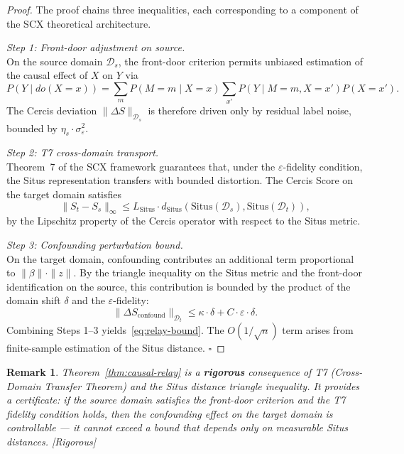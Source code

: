 \documentclass[12pt,a4paper]{article}
\newtheorem{remark}[theorem]{Remark}
\newcommand{\rigorous}{\textcolor{green!50!black}{\small\textsf{[Rigorous]}}}
\newcommand{\cD}{\mathcal{D}}
\newcommand{\Situs}{\mathrm{Situs}}
\begin{document}
\begin{proof}
The proof chains three inequalities, each corresponding to a component of the
SCX theoretical architecture.

\textit{Step 1: Front-door adjustment on source.}\\
On the source domain $\cD_s$, the front-door criterion permits unbiased
estimation of the causal effect of $X$ on $Y$ via
\begin{equation}\label{eq:front-door}
    P(Y \mid do(X=x)) = \sum_m P(M=m \mid X=x)
    \sum_{x'} P(Y \mid M=m, X=x') P(X=x').
\end{equation}
The Cercis deviation $\|\Delta S\|_{\cD_s}$ is therefore driven only by
residual label noise, bounded by $\eta_s \cdot \sigma^2_\varepsilon$.

\textit{Step 2: T7 cross-domain transport.}\\
Theorem~7 of the SCX framework guarantees that, under the $\varepsilon$-fidelity
condition, the Situs representation transfers with bounded distortion.  The
Cercis Score on the target domain satisfies
\begin{equation}\label{eq:t7-transport}
    \|S_t - S_s\|_{\infty} \leq L_{\Situs} \cdot
    d_{\Situs}(\Situs(\cD_s), \Situs(\cD_t)),
\end{equation}
by the Lipschitz property of the Cercis operator with respect to the Situs
metric.

\textit{Step 3: Confounding perturbation bound.}\\
On the target domain, confounding contributes an additional term proportional
to $\|\beta\| \cdot \|z\|$.  By the triangle inequality on the Situs metric
and the front-door identification on the source, this contribution is bounded
by the product of the domain shift $\delta$ and the $\varepsilon$-fidelity:
\begin{equation}\label{eq:confounding-bound}
    \|\Delta S_{\mathrm{confound}}\|_{\cD_t}
    \leq \kappa \cdot \delta + C \cdot \varepsilon \cdot \delta.
\end{equation}
Combining Steps 1--3 yields~\eqref{eq:relay-bound}.  The $O(1/\sqrt{n})$ term
arises from finite-sample estimation of the Situs distance.  $\square$
\end{proof}

\begin{remark}
Theorem~\ref{thm:causal-relay} is a \textbf{rigorous} consequence of T7
(Cross-Domain Transfer Theorem) and the Situs distance triangle inequality.
It provides a certificate: if the source domain satisfies the front-door
criterion and the T7 fidelity condition holds, then the confounding effect on
the target domain is \emph{controllable} — it cannot exceed a bound that depends
only on measurable Situs distances.  \rigorous
\end{remark}
\end{document}
